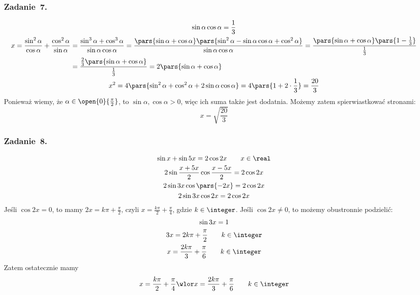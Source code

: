 \subsubsection*{Zadanie~7.}
\begin{gather*}
    \sin\alpha\cos\alpha = \frac{1}{3}\\
    \begin{split}
        x = \frac{\sin^2\alpha}{\cos\alpha} + \frac{\cos^2\alpha}{\sin\alpha}
            &= \frac{\sin^3\alpha + \cos^3\alpha}{\sin\alpha\cos\alpha}
            = \frac{\pars{\sin\alpha + \cos\alpha}\pars{\sin^2\alpha - \sin\alpha\cos\alpha + \cos^2\alpha}}{\sin\alpha\cos\alpha}
            = \frac{\pars{\sin\alpha + \cos\alpha}\pars{1 - \frac{1}{3}}}{\frac{1}{3}}\\
            &= \frac{\frac{2}{3}\pars{\sin\alpha + \cos\alpha}}{\frac{1}{3}}
            = 2\pars{\sin\alpha + \cos\alpha}
    \end{split}\\
    x^2 = 4\pars{\sin^2\alpha + \cos^2\alpha + 2\sin\alpha\cos\alpha} = 4\pars{1 + 2 \cdot \frac{1}{3}} = \frac{20}{3}
\end{gather*}
Ponieważ wiemy, że \(\alpha \in \open{0}{\frac{\pi}{2}}\), to \(\sin\alpha, \cos\alpha > 0\), więc ich suma także jest dodatnia. Możemy zatem spierwiastkować stronami:
\begin{equation*}
    x = \sqrt{\frac{20}{3}}
\end{equation*}
\subsubsection*{Zadanie~8.}
\begin{gather*}
    \sin x + \sin5x = 2\cos2x \qquad x \in \real\\
    2\sin\frac{x + 5x}{2}\cos\frac{x - 5x}{2} = 2\cos2x\\
    2\sin3x\cos\pars{-2x} = 2\cos2x\\
    2\sin3x\cos2x = 2\cos2x
\end{gather*}
Jeśli \(\cos2x = 0\), to mamy \(2x = k\pi + \frac{\pi}{2}\), czyli \(x = \frac{k\pi}{2} + \frac{\pi}{4}\), gdzie \(k \in \integer\). Jeśli \(\cos2x \neq 0\), to możemy obustronnie podzielić:
\begin{gather*}
    \sin3x = 1\\
    3x = 2k\pi + \frac{\pi}{2} \qquad k \in \integer\\
    x = \frac{2k\pi}{3} + \frac{\pi}{6} \qquad k \in \integer
\end{gather*}
Zatem ostatecznie mamy
\begin{equation*}
    x = \frac{k\pi}{2} + \frac{\pi}{4} \wlor x = \frac{2k\pi}{3} + \frac{\pi}{6} \qquad k \in \integer
\end{equation*}
